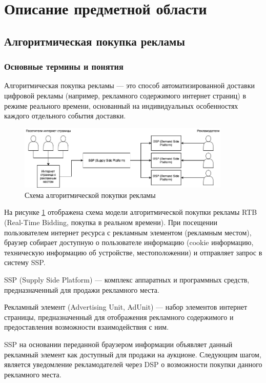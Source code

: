 \section{Описание предметной области}
\subsection{Алгоритмическая покупка рекламы}
\subsubsection{Основные термины и понятия}

Алгоритмическая покупка рекламы --- это способ автоматизированной доставки цифровой рекламы (например, 
рекламного содержимого интернет страниц) в режиме реального времени, основанный на индивидуальных 
особенностях каждого отдельного события доставки.

\begin{figure}[h!]
    \centering
    \includegraphics[width=0.9\textwidth]{inc/images/rtb.png}
    \caption{Схема алгоритмической покупки рекламы}
    \label{img:pragrammatic-advertising}
\end{figure}

На рисунке \ref{img:pragrammatic-advertising} отображена схема модели алгоритмической покупки рекламы
RTB (Real-Time Bidding, покупка в реальном времени). При посещении пользователем интернет ресурса 
с рекламным элементом (рекламным местом), браузер собирает доступную о пользователе информацию 
(cookie информацию, техническую информацию об устройстве, местоположении) и отправляет запрос в систему SSP.

SSP (Supply Side Platform) --- комплекс аппаратных и программных средств, предназначенный для продажи 
рекламного места.

Рекламный элемент (Advertising Unit, AdUnit) --- набор элементов интернет страницы, предназначенный для 
отображения рекламного содержимого и предоставления возможности взаимодействия с ним.

SSP на основании переданной браузером информации объявляет данный рекламный элемент как доступный для 
продажи на аукционе. Следующим шагом, является уведомление рекламодателей через DSP о возможности покупки
данного рекламного места.

